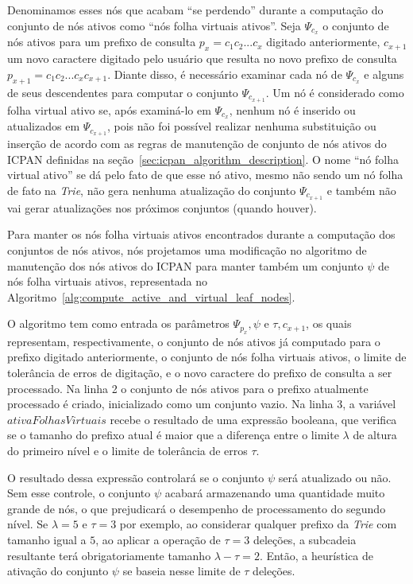 Denominamos esses nós que acabam ``se perdendo'' durante a computação do conjunto de nós ativos como ``nós folha virtuais ativos''. Seja $\Psi_{c_{x}}$ o conjunto de nós ativos para um prefixo de consulta $p_{x} = c_1c_2...c_{x}$ digitado anteriormente, $c_{x+1}$ um novo caractere digitado pelo usuário que resulta no novo prefixo de consulta $p_{x+1} = c_1c_2...c_{x}c_{x + 1}$. Diante disso, é necessário examinar cada nó de $\Psi_{c_{x}}$ e alguns de seus descendentes para computar o conjunto $\Psi_{c_{x + 1}}$. Um nó é considerado como folha virtual ativo se, após examiná-lo em $\Psi_{c_{x}}$, nenhum nó é inserido ou atualizados em $\Psi_{c_{x + 1}}$, pois não foi possível realizar nenhuma substituição ou inserção de acordo com as regras de manutenção de conjunto de nós ativos do ICPAN definidas na seção~\ref{sec:icpan_algorithm_description}. O nome ``nó folha virtual ativo'' se dá pelo fato de que esse nó ativo, mesmo não sendo um nó folha de fato na \textit{Trie}, não gera nenhuma atualização do conjunto $\Psi_{c_{x + 1}}$ e também não vai gerar atualizações nos próximos conjuntos (quando houver).

Para manter os nós folha virtuais ativos encontrados durante a computação dos conjuntos de nós ativos, nós projetamos uma modificação no algoritmo de manutenção dos nós ativos do ICPAN para manter também um conjunto $\psi$ de nós folha virtuais ativos, representada no Algoritmo~\ref{alg:compute_active_and_virtual_leaf_nodes}.

O algoritmo tem como entrada os parâmetros $\Psi_{p_x}, \psi$ e $\tau, c_{x+1}$, os quais representam, respectivamente, o conjunto de nós ativos já computado para o prefixo digitado anteriormente, o conjunto de nós folha virtuais ativos, o limite de tolerância de erros de digitação, e o novo caractere do prefixo de consulta a ser processado. Na linha 2 o conjunto de nós ativos para o prefixo atualmente processado é criado, inicializado como um conjunto vazio. Na linha 3, a variável $ativaFolhasVirtuais$ recebe o resultado de uma expressão booleana, que verifica se o tamanho do prefixo atual é maior que a diferença entre o limite $\lambda$ de altura do primeiro nível e o limite de tolerância de erros $\tau$. 

O resultado dessa expressão controlará se o conjunto $\psi$ será atualizado ou não. Sem esse controle, o conjunto $\psi$ acabará armazenando uma quantidade muito grande de nós, o que prejudicará o desempenho de processamento do segundo nível. Se $\lambda = 5$ e $\tau = 3$ por exemplo, ao considerar qualquer prefixo da \textit{Trie} com tamanho igual a $5$, ao aplicar a operação de $\tau = 3$ deleções, a subcadeia resultante terá obrigatoriamente tamanho $\lambda - \tau = 2$. Então, a heurística de ativação do conjunto $\psi$ se baseia nesse limite de $\tau$ deleções. 

